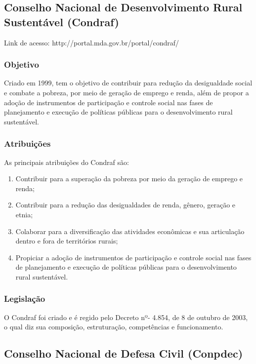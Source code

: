 \subsection*{Conselho Nacional de Desenvolvimento Rural Sustentável (Condraf)}

Link de acesso: http://portal.mda.gov.br/portal/condraf/

\subsubsection*{Objetivo}

Criado em 1999, tem o objetivo de contribuir para redução da
desigualdade social e combate a pobreza, por meio de geração de
emprego e renda, além de propor a adoção de instrumentos de
participação e controle social nas fases de planejamento e
execução de políticas públicas para o desenvolvimento rural
sustentável.

\subsubsection*{Atribuições}

As principais atribuições do Condraf são:

\begin{enumerate}
\item 
Contribuir para a superação da pobreza por meio da geração
de emprego e renda;
\item 
Contribuir para a redução das desigualdades de renda, gênero,
geração e etnia;
\item 
Colaborar para a diversificação das atividades econômicas e sua
articulação dentro e fora de territórios rurais;
\item 
Propiciar a adoção de instrumentos de participação e
controle social nas fases de planejamento e execução de
políticas públicas para o desenvolvimento rural sustentável.
\end{enumerate}

\subsubsection*{Legislação}

O Condraf foi criado e é regido pelo Decreto nº-
4.854, de 8 de outubro de 2003, o qual diz sua composição,
estruturação, competências e funcionamento.
\newpage
\subsection*{Conselho Nacional de Defesa Civil (Conpdec)}

